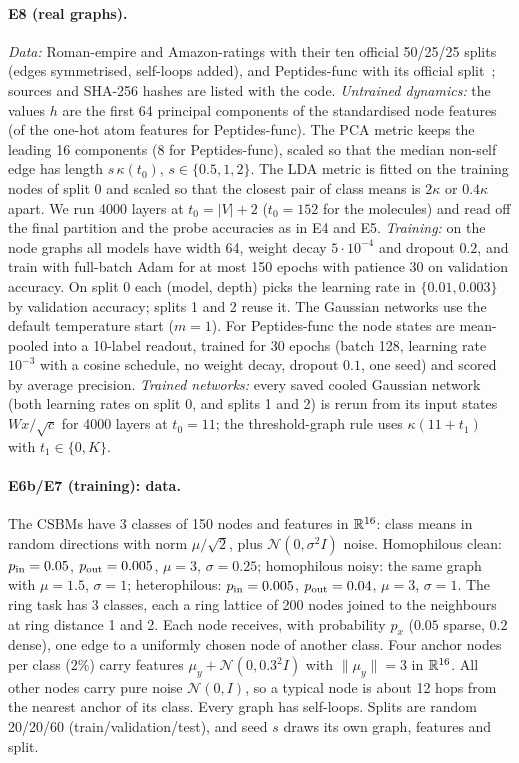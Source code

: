 \paragraph{E8 (real graphs).} \emph{Data:} Roman-empire and Amazon-ratings with their ten official 50/25/25 splits~\citep{platonov2023}
(edges symmetrised, self-loops added), and Peptides-func with its official split~\citep{dwivedi2022}; sources and SHA-256 hashes are listed
with the code. \emph{Untrained dynamics:} the values $h$ are the first 64 principal components of the standardised node features (of the
one-hot atom features for Peptides-func). The PCA metric keeps the leading 16 components (8 for Peptides-func), scaled so that the median
non-self edge has length $s\,\kappa(t_0)$, $s\in\{0.5,1,2\}$. The LDA metric is fitted on the training nodes of split 0 and scaled so that the
closest pair of class means is $2\kappa$ or $0.4\kappa$ apart. We run 4000 layers at $t_0=|V|+2$ ($t_0=152$ for the molecules) and read off
the final partition and the probe accuracies as in E4 and E5. \emph{Training:} on the node graphs all models have width 64, weight decay $5\cdot10^{-4}$ and
dropout $0.2$, and train with full-batch Adam for at most 150 epochs with patience 30 on validation accuracy. On split 0 each (model, depth)
picks the learning rate in $\{0.01,0.003\}$ by validation accuracy; splits 1 and 2 reuse it. The Gaussian networks use the default
temperature start ($m=1$). For Peptides-func the node states are mean-pooled into a 10-label readout, trained for 30 epochs (batch 128,
learning rate $10^{-3}$ with a cosine schedule, no weight decay, dropout $0.1$, one seed) and scored by average precision. \emph{Trained networks:} every
saved cooled Gaussian network (both learning rates on split 0, and splits 1 and 2) is rerun from its input states $Wx/\sqrt c$ for 4000
layers at $t_0=11$; the threshold-graph rule uses $\kappa(11+t_1)$ with $t_1\in\{0,K\}$.

\paragraph{E6b/E7 (training): data.} The CSBMs have 3 classes of 150 nodes and features in $\mathbb{R}^{16}$: class means in random directions with
norm $\mu/\sqrt2$, plus $\mathcal N(0,\sigma^2I)$ noise. Homophilous clean: $p_{\rm in}=0.05$, $p_{\rm out}=0.005$, $\mu=3$, $\sigma=0.25$;
homophilous noisy: the same graph with $\mu=1.5$, $\sigma=1$; heterophilous: $p_{\rm in}=0.005$, $p_{\rm out}=0.04$, $\mu=3$, $\sigma=1$. The
ring task has 3 classes, each a ring lattice of 200 nodes joined to the neighbours at ring distance 1 and 2. Each node receives, with
probability $p_x$ ($0.05$ sparse, $0.2$ dense), one edge to a uniformly chosen node of another class. Four anchor nodes per class ($2\%$) carry
features $\mu_y+\mathcal N(0,0.3^2I)$ with $\|\mu_y\|=3$ in $\mathbb{R}^{16}$. All other nodes carry pure noise $\mathcal N(0,I)$, so a typical node is
about 12 hops from the nearest anchor of its class. Every graph has self-loops. Splits are random 20/20/60 (train/validation/test), and
seed $s$ draws its own graph, features and split.


